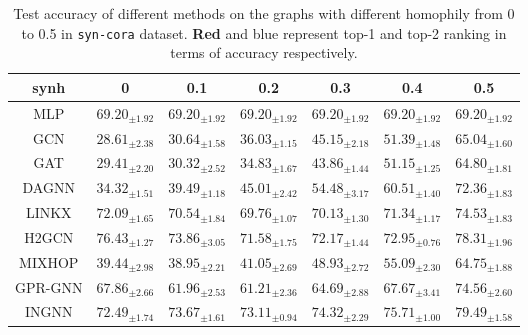 \documentclass{article}
\theoremstyle{plain}
\newcommand{\pjn}{{INGNN}}
\begin{document}
\begin{table}[ht]
\centering
\caption{Test accuracy of different methods on the graphs with different homophily from 0 to 0.5 in \texttt{syn-cora} dataset. {\color{red} \textbf{Red}} and {\color{blue} blue} represent top-1 and top-2 ranking in terms of accuracy respectively.}
\label{tab:syn-cora-results1}
\vskip 0.1in
\small
\tabcolsep=0.1cm
\begin{tabular}{c|cccccc}
\toprule
synh   & 0                                                                                       & 0.1                                                                                     & 0.2                                                                                     & 0.3                                                                                     & 0.4                                                                                     & 0.5                                                                                                                                                                           \\
\midrule
\midrule
MLP	& $69.20_{\pm 1.92}$	  & $69.20_{\pm 1.92}$	 & $69.20_{\pm 1.92}$	 & $69.20_{\pm 1.92}$	 & $69.20_{\pm1.92}$	  & $69.20_{\pm 1.92}$		 \\
GCN	& $28.61_{\pm 2.38}$	 & $30.64_{\pm 1.58}$	 & $36.03_{\pm 1.15}$	 & $45.15_{\pm 2.18}$	 & $51.39_{\pm1.48}$	  & $65.04_{\pm 1.60}$	 	 \\
GAT	& $29.41_{\pm 2.20}$	 & $30.32_{\pm 2.52}$	 & $34.83_{\pm 1.67}$	 & $43.86_{\pm 1.44}$	 & $51.15_{\pm 1.25}$	 & $64.80_{\pm 1.81}$	  \\
DAGNN  & $34.32_{\pm 1.51}$	 & $39.49_{\pm 1.18}$	 & $45.01_{\pm 2.42}$	 & $54.48_{\pm 3.17}$	 & $60.51_{\pm 1.40}$	 & $72.36_{\pm 1.83}$	  \\
LINKX  & $72.09_{\pm 1.65}$	 & $70.54_{\pm 1.84}$	 & $69.76_{\pm 1.07}$	 & $70.13_{\pm 1.30}$	 & $71.34_{\pm 1.17}$	 & $74.53_{\pm 1.83}$	 	 \\
H2GCN  & {\color[HTML]{FF0000} $\mathbf{76.43_{\pm 1.27}}$} & {\color[HTML]{FF0000} $\mathbf{73.86_{\pm 3.05}}$} & {\color[HTML]{0000FF} $71.58_{\pm 1.75}$}	  & {\color[HTML]{0000FF} $72.17_{\pm 1.44}$}	  & {\color[HTML]{0000FF} $72.95_{\pm 0.76}$}	& {\color[HTML]{0000FF} $78.31_{\pm 1.96}$} 	 \\
MIXHOP & $39.44_{\pm 2.98}$	 & $38.95_{\pm 2.21}$	 & $41.05_{\pm 2.69}$	 & $48.93_{\pm 2.72}$	 & $55.09_{\pm 2.30}$	 & $64.75_{\pm 1.88}$	  \\
GPR-GNN & $67.86_{\pm 2.66}$	 & $61.96_{\pm 2.53}$	 & $61.21_{\pm 2.36}$	 & $64.69_{\pm 2.88}$	 & $67.67_{\pm 3.41}$	 & $74.56_{\pm 2.60}$	  \\
\pjn{}   & {\color[HTML]{0000FF} $72.49_{\pm 1.74}$}	  & {\color[HTML]{0000FF} $73.67_{\pm 1.61}$}	  & {\color[HTML]{FF0000} $\mathbf{73.11_{\pm 0.94}}$} & {\color[HTML]{FF0000} $\mathbf{74.32_{\pm 2.29}}$} & {\color[HTML]{FF0000} $\mathbf{75.71_{\pm 1.00}}$} & {\color[HTML]{FF0000} $\mathbf{79.49_{\pm 1.58}}$} 	 \\
\bottomrule
\end{tabular}
\end{table}
\end{document}
